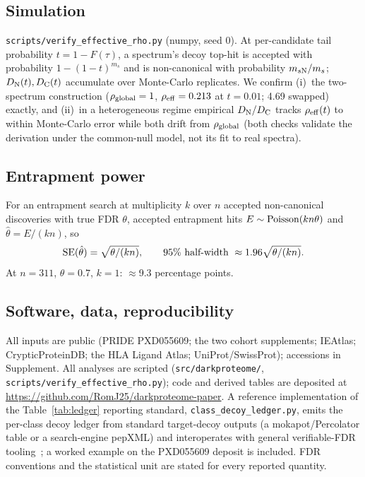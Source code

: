 \subsection{Simulation}
\texttt{scripts/verify\_effective\_rho.py} (numpy, seed 0). At per-candidate tail probability $t=1-F(\tau)$, a spectrum's decoy top-hit is accepted with probability $1-(1-t)^{m_s}$ and is non-canonical with probability $m_{s\mathrm{N}}/m_s$; $D_{\mathrm{N}}(t),D_{\mathrm{C}}(t)$ accumulate over Monte-Carlo replicates. We confirm (i)~the two-spectrum construction ($\rho_{\mathrm{global}}=1$, $\rho_{\mathrm{eff}}=0.213$ at $t=0.01$; 4.69 swapped) exactly, and (ii)~in a heterogeneous regime empirical $D_{\mathrm{N}}/D_{\mathrm{C}}$ tracks $\rho_{\mathrm{eff}}(t)$ to within Monte-Carlo error while both drift from $\rho_{\mathrm{global}}$ (both checks validate the derivation under the common-null model, not its fit to real spectra).

\subsection{Entrapment power}
For an entrapment search at multiplicity $k$ over $n$ accepted non-canonical discoveries with true FDR $\theta$, accepted entrapment hits $E\sim\operatorname{Poisson}(kn\theta)$ and $\hat{\theta}=E/(kn)$, so
\begin{equation}
\operatorname{SE}(\hat{\theta})=\sqrt{\theta/(kn)},\qquad \text{95\% half-width}\ \approx 1.96\sqrt{\theta/(kn)} .
\label{eq:entrap}
\end{equation}
At $n=311$, $\theta=0.7$, $k=1$: $\approx$9.3 percentage points.

\subsection{Software, data, reproducibility}
All inputs are public (PRIDE PXD055609; the two cohort supplements; IEAtlas; CrypticProteinDB; the HLA Ligand Atlas; UniProt/SwissProt); accessions in Supplement. All analyses are scripted (\texttt{src/darkproteome/}, \texttt{scripts/verify\_effective\_rho.py}); code and derived tables are deposited at \mbox{\url{https://github.com/RomJ25/darkproteome-paper}}. A reference implementation of the Table~\ref{tab:ledger} reporting standard, \texttt{class\_decoy\_ledger.py}, emits the per-class decoy ledger from standard target-decoy outputs (a mokapot/Percolator table or a search-engine pepXML) and interoperates with general verifiable-FDR tooling~\cite{r21}; a worked example on the PXD055609 deposit is included. FDR conventions and the statistical unit are stated for every reported quantity.

